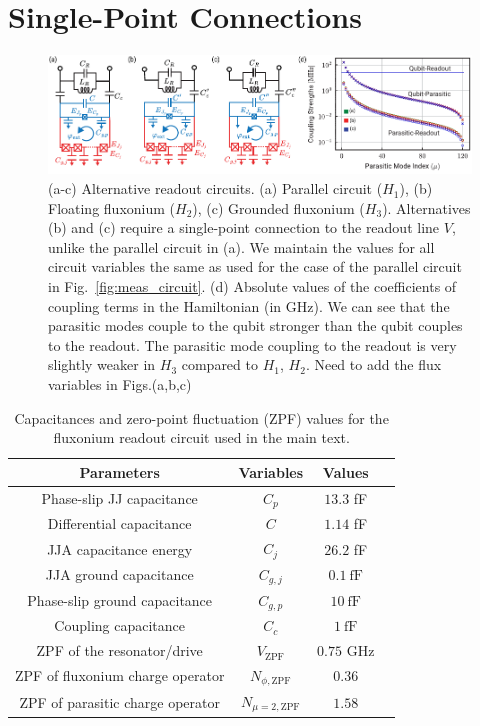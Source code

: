 \documentclass[%
reprint,
superscriptaddress,
 amsmath,amssymb,
 aps,
 prx,
longbibliography,
floatfix,
]{revtex4-2}
\begin{document}
\section{Single-Point Connections}\label{app:alt_circuits}
\begin{figure}[htb]
    \centering
    \includegraphics[width=\linewidth]{Supp_Fig/Circuit_choice.pdf}
    \caption{(a-c) Alternative readout circuits. (a) Parallel circuit ($H_1$), (b) Floating fluxonium ($H_2$), (c) Grounded fluxonium ($H_3$). Alternatives (b) and (c) require a single-point connection to the readout line $V$, unlike the parallel circuit in (a). We maintain the values for all circuit variables the same as used for the case of the parallel circuit in Fig.~\ref{fig:meas_circuit}. (d) Absolute values of the coefficients of coupling terms in the Hamiltonian (in GHz). We can see that the parasitic modes couple to the qubit stronger than the qubit couples to the readout. The parasitic mode coupling to the readout is very slightly weaker in $H_3$ compared to $H_1$, $H_2$. Need to add the flux variables in Figs.(a,b,c)}
    \label{fig:circuit_choice}
\end{figure}

\begin{table}[htb]
    \begin{center}
    \begin{tabular}{|c |c| c |c| }
     \hline
     \textbf{Parameters} & \textbf{Variables} & \textbf{Values}\\ 
    \hline
    Phase-slip JJ capacitance &$C_p$ &$13.3$ fF\\ 
    \hline
    Differential capacitance &$C$ &$1.14$ fF\\ 
    \hline
    JJA capacitance energy&$C_j$&$26.2$ fF\\ 
    \hline
    JJA ground capacitance&$C_{g,j}$&$0.1 \ \mathrm{fF}$\\ 
    \hline
    Phase-slip ground capacitance&$C_{g,p}$&$10 \ \mathrm{fF}$\\ 
    \hline
    Coupling capacitance&$C_c$ &$1 \ \mathrm{fF}$\\ 
     \hline
      ZPF of the resonator/drive&$V_{\mathrm{ZPF}}$&$0.75$ GHz\\
     \hline
      ZPF of fluxonium charge operator&$N_{\phi,\mathrm{ZPF}}$&$0.36$\\
     \hline
      ZPF of parasitic charge operator&$N_{\mu=2,\mathrm{ZPF}}$&$1.58$\\
     \hline
    \end{tabular}
    \end{center}
    
    \caption{Capacitances and zero-point fluctuation (ZPF) values for the fluxonium readout circuit used in the main text.}
    \label{tab:params}
    \end{table}
\end{document}
